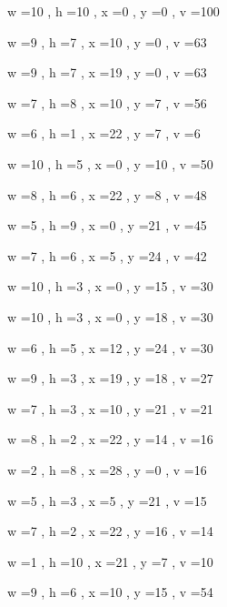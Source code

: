 \documentclass[11pt]{article}
\begin{document}
w =10 , h =10 , x =0 , y =0 , v =100
\par
w =9 , h =7 , x =10 , y =0 , v =63
\par
w =9 , h =7 , x =19 , y =0 , v =63
\par
w =7 , h =8 , x =10 , y =7 , v =56
\par
w =6 , h =1 , x =22 , y =7 , v =6
\par
w =10 , h =5 , x =0 , y =10 , v =50
\par
w =8 , h =6 , x =22 , y =8 , v =48
\par
w =5 , h =9 , x =0 , y =21 , v =45
\par
w =7 , h =6 , x =5 , y =24 , v =42
\par
w =10 , h =3 , x =0 , y =15 , v =30
\par
w =10 , h =3 , x =0 , y =18 , v =30
\par
w =6 , h =5 , x =12 , y =24 , v =30
\par
w =9 , h =3 , x =19 , y =18 , v =27
\par
w =7 , h =3 , x =10 , y =21 , v =21
\par
w =8 , h =2 , x =22 , y =14 , v =16
\par
w =2 , h =8 , x =28 , y =0 , v =16
\par
w =5 , h =3 , x =5 , y =21 , v =15
\par
w =7 , h =2 , x =22 , y =16 , v =14
\par
w =1 , h =10 , x =21 , y =7 , v =10
\par
w =9 , h =6 , x =10 , y =15 , v =54
\par
\newpage
\end{document}
